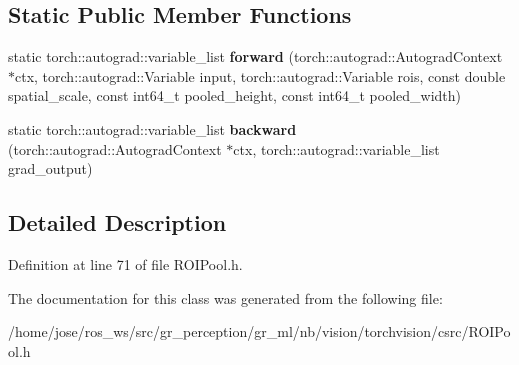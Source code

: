 \subsection*{Static Public Member Functions}
\begin{DoxyCompactItemize}
\item 
\mbox{\label{classROIPoolFunction_a8d7d64190f5be09b4664bf6f8e41f8f0}} 
static torch\+::autograd\+::variable\+\_\+list {\bfseries forward} (torch\+::autograd\+::\+Autograd\+Context $\ast$ctx, torch\+::autograd\+::\+Variable input, torch\+::autograd\+::\+Variable rois, const double spatial\+\_\+scale, const int64\+\_\+t pooled\+\_\+height, const int64\+\_\+t pooled\+\_\+width)
\item 
\mbox{\label{classROIPoolFunction_ab112f337ebc4067d48a3c3928d5a69b8}} 
static torch\+::autograd\+::variable\+\_\+list {\bfseries backward} (torch\+::autograd\+::\+Autograd\+Context $\ast$ctx, torch\+::autograd\+::variable\+\_\+list grad\+\_\+output)
\end{DoxyCompactItemize}


\subsection{Detailed Description}


Definition at line 71 of file R\+O\+I\+Pool.\+h.



The documentation for this class was generated from the following file\+:\begin{DoxyCompactItemize}
\item 
/home/jose/ros\+\_\+ws/src/gr\+\_\+perception/gr\+\_\+ml/nb/vision/torchvision/csrc/R\+O\+I\+Pool.\+h\end{DoxyCompactItemize}

